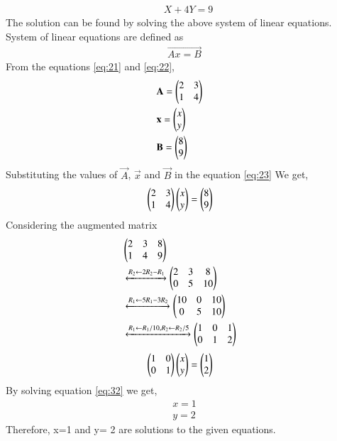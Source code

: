 \documentclass[journal,12pt,twocolumn]{IEEEtran}
\renewcommand\thesection{\arabic{section}}
\begin{document}
\begin{enumerate}[label=\thesection.\arabic*.,ref=\thesection.\theenumi]
\begin{align}
&X+4Y=9 \label{eq:22}
\end{align}
The solution can be found by solving the above system of linear equations.\\ 
System of linear equations are defined as 
\begin{align}
\vec{Ax=B} \label{eq:23}
\end{align}
From the equations \eqref{eq:21} and \eqref{eq:22}, 
\begin{align}
&\vec{A}= \myvec{2 &3\\1 & 4}&\\
\medskip
&\vec{x}= \myvec{ x\\ y}&\\
\medskip
&\vec{B}= \myvec{8\\9}&  
\end{align} 
Substituting the values of $\vec{A}$, $\vec{x}$ and $\vec{B}$ in the equation \eqref{eq:23}
We get,
\begin{align}
&\begin{pmatrix}2&3\\1&4\end{pmatrix} \begin{pmatrix}x\\y\end{pmatrix}= \begin{pmatrix}8\\9\end{pmatrix}&
\end{align}
Considering the augmented matrix 
 \begin{align}
& \begin{pmatrix}2&3&8\\1&4&9\end{pmatrix}&
 \\
&\xleftrightarrow[]{ R_2 \leftarrow 2R_2 - R_1}
 \begin{pmatrix}2&3&8\\0&5&10\end{pmatrix}&\\
 &\xleftrightarrow[]{ R_1 \leftarrow 5R_1 - 3R_2}
 \begin{pmatrix}10&0&10\\0&5&10\end{pmatrix}&\\
 &\xleftrightarrow[]{ R_1 \leftarrow R_1/10,R_2\leftarrow R_2/5}
 \begin{pmatrix}1&0&1\\0&1&2\end{pmatrix}&
 \end{align}
 \begin{align}
&\myvec{1&0\\0&1} \myvec{x\\y}= \myvec{1\\2}& \label{eq:32}
\medskip
\end{align}
By solving equation \eqref{eq:32} we get,
\begin{align}
&x=1&\\
&y= 2&
\end{align}
Therefore, x=1 and y= 2 are solutions to the given equations.
\begin{figure}[H]
	\centering

\end{figure}
\end{enumerate}
\end{document}
